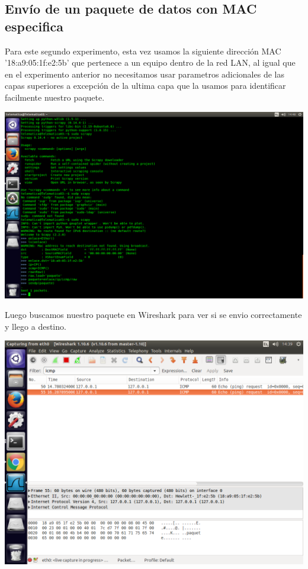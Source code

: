\documentclass[spanish]{udpreport}
\begin{document}



\subsection{Envío de un paquete de datos con MAC especifica}

Para este segundo experimento, esta vez usamos la siguiente dirección MAC '18:a9:05:1f:e2:5b' que pertenece a un equipo dentro de la red LAN, al igual que en el experimento anterior no necesitamos usar parametros adicionales de las capas superiores a excepción de la ultima capa que la usamos para identificar facilmente nuestro paquete.

\begin{center}
	\includegraphics[scale=.37]{imagenes/Switch/Test_2.png}
\end{center}

Luego buscamos nuestro paquete en Wireshark para ver si se envio correctamente y llego a destino.

\begin{center}
	\includegraphics[scale=.37]{imagenes/Switch/Test_2_Wireshark.png}
\end{center}
\end{document}
